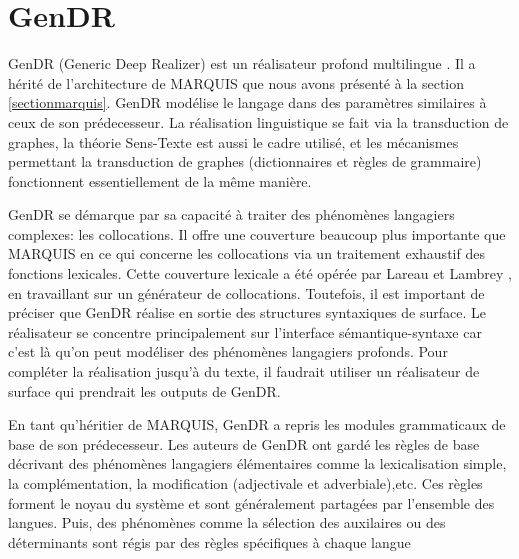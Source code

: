 
\chapter{GenDR}\label{chapgendr}

GenDR (Generic Deep Realizer) est un réalisateur profond multilingue \citep{lareau18}. Il a hérité de l'architecture de MARQUIS \cite{WannerMARQUISGENERATIONUSERTAILORED2010} que nous avons présenté à la section \ref{sectionmarquis}. GenDR modélise le langage dans des paramètres similaires à ceux de son prédecesseur. La réalisation linguistique se fait via la transduction de graphes, la théorie Sens-Texte est aussi le cadre utilisé, et les mécanismes permettant la transduction de graphes (dictionnaires et règles de grammaire) fonctionnent essentiellement de la même manière.

GenDR se démarque par sa capacité à traiter des phénomènes langagiers complexes: les collocations. Il offre une couverture beaucoup plus importante que MARQUIS en ce qui concerne les collocations via un traitement exhaustif des fonctions lexicales. Cette couverture lexicale a été opérée par Lareau et Lambrey \cite{LambreyImplementationcollocationspour2017}, \cite{lambrey15} en travaillant sur un générateur de collocations. Toutefois, il est important de préciser que GenDR réalise en sortie des structures syntaxiques de surface. Le réalisateur se concentre principalement sur l'interface sémantique-syntaxe car c'est là qu'on peut modéliser des phénomènes langagiers profonds. Pour compléter la réalisation jusqu'à du texte, il faudrait utiliser un réalisateur de surface qui prendrait les outputs de GenDR.

En tant qu'héritier de MARQUIS, GenDR a repris les modules grammaticaux de base de son prédecesseur. Les auteurs de GenDR ont gardé les règles de base décrivant des phénomènes langagiers élémentaires comme la  lexicalisation simple, la complémentation, la modification (adjectivale et adverbiale),etc. Ces règles forment le noyau du système et sont généralement partagées par l'ensemble des langues. Puis, des phénomènes comme la sélection des auxilaires ou des déterminants sont régis par des règles spécifiques à chaque langue


